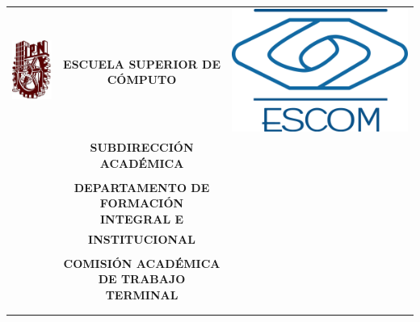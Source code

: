 \newpage
\begin{titlepage}
    \begin{center}
    \begin{tabular}{r c l}

    \includegraphics[scale=.20]{images/ipn} & \small \textbf{ESCUELA SUPERIOR DE C\'OMPUTO} & \includegraphics[scale=.20]{images/escom}\\ 
    &\small \textbf{SUBDIRECCI\'ON ACAD\'EMICA} \\\\
    &\small \textbf{DEPARTAMENTO DE FORMACI\'ON INTEGRAL E}\\
    &\small \textbf{INSTITUCIONAL}\\\\
    &\small \textbf{COMISI\'ON ACAD\'EMICA DE TRABAJO TERMINAL }\\\\\\
    \end{tabular}
    \end{center}



\end{titlepage}
